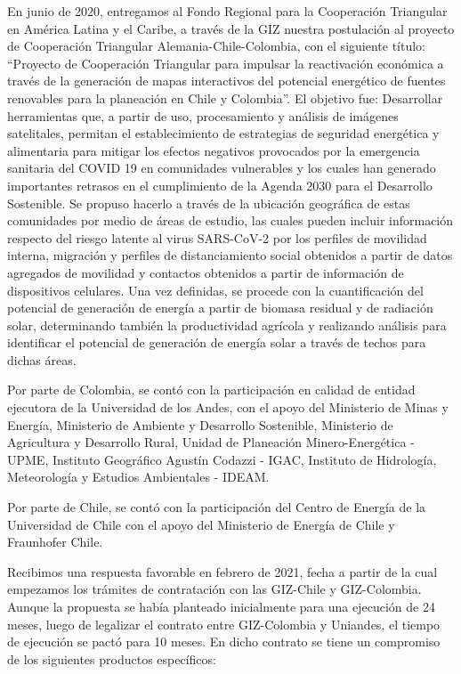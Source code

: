 En junio de 2020, entregamos al Fondo Regional para la Cooperación Triangular en América Latina y el Caribe, a través de la GIZ nuestra postulación al proyecto
de Cooperación Triangular Alemania-Chile-Colombia, con el siguiente título: ``Proyecto de Cooperación Triangular para impulsar la reactivación económica a
través de la generación de mapas interactivos del potencial energético de fuentes renovables para la planeación en Chile y Colombia''. El objetivo
fue: Desarrollar herramientas que, a partir de uso, procesamiento y análisis de imágenes satelitales, permitan el establecimiento de estrategias de seguridad
energética y alimentaria para mitigar los efectos negativos provocados por la emergencia sanitaria del COVID 19 en comunidades vulnerables y los cuales han
generado importantes retrasos en el cumplimiento de la Agenda 2030 para el Desarrollo Sostenible. Se propuso hacerlo a través de la ubicación geográfica de
estas comunidades por medio de áreas de estudio, las cuales pueden incluir información respecto del riesgo latente al virus SARS-CoV-2 por los perfiles de
movilidad interna, migración y perfiles de distanciamiento social obtenidos a partir de datos agregados de movilidad y contactos obtenidos a partir de
información de dispositivos celulares. Una vez definidas, se procede con la cuantificación del potencial de generación de energía a partir de biomasa residual y
de radiación solar, determinando también la productividad agrícola y realizando análisis para identificar el potencial de generación de energía solar a través
de techos para dichas áreas.

Por parte de Colombia, se contó con la participación en calidad de entidad ejecutora de la Universidad de los Andes, con el apoyo del Ministerio de Minas y
Energía, Ministerio de Ambiente y Desarrollo Sostenible, Ministerio de Agricultura y Desarrollo Rural, Unidad de Planeación Minero-Energética - UPME,
Instituto Geográfico Agustín Codazzi - IGAC, Instituto de Hidrología, Meteorología y Estudios Ambientales - IDEAM.

Por parte de Chile, se contó con la participación del Centro de Energía de la Universidad de Chile con el apoyo del Ministerio de Energía de Chile y Fraunhofer
Chile.

Recibimos una respuesta favorable en febrero de 2021, fecha a partir de la cual empezamos los trámites de contratación con las GIZ-Chile y GIZ-Colombia. Aunque
la propuesta se había planteado inicialmente para una ejecución de 24 meses, luego de legalizar el contrato entre GIZ-Colombia y Uniandes, el tiempo de
ejecución se pactó para 10 meses. En dicho contrato se tiene un compromiso de los siguientes productos específicos:

